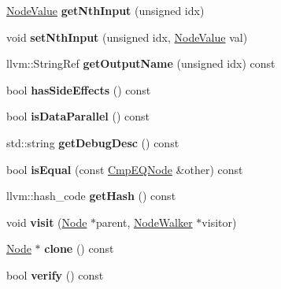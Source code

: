 \begin{DoxyCompactItemize}
\mbox{\label{classglow_1_1_cmp_e_q_node_acce58043f0d104161e728a8f650e8a51}} 
\hyperlink{structglow_1_1_node_value}{Node\+Value} {\bfseries get\+Nth\+Input} (unsigned idx)
\item 
\mbox{\label{classglow_1_1_cmp_e_q_node_a7d92ca06ce4b429dc00ee086a8bfa54b}} 
void {\bfseries set\+Nth\+Input} (unsigned idx, \hyperlink{structglow_1_1_node_value}{Node\+Value} val)
\item 
\mbox{\label{classglow_1_1_cmp_e_q_node_aba81b4f991f670f99168422720743284}} 
llvm\+::\+String\+Ref {\bfseries get\+Output\+Name} (unsigned idx) const
\item 
\mbox{\label{classglow_1_1_cmp_e_q_node_a1f5f8e69817a0eb9b35e6c460cb23ecc}} 
bool {\bfseries has\+Side\+Effects} () const
\item 
\mbox{\label{classglow_1_1_cmp_e_q_node_a530057c3737cf5bdf6a593dd7e80a352}} 
bool {\bfseries is\+Data\+Parallel} () const
\item 
\mbox{\label{classglow_1_1_cmp_e_q_node_a2541748fa47527b03bc21b7cc060431a}} 
std\+::string {\bfseries get\+Debug\+Desc} () const
\item 
\mbox{\label{classglow_1_1_cmp_e_q_node_ab3ba9251d0fcfb6ab3400fc9e9cee704}} 
bool {\bfseries is\+Equal} (const \hyperlink{classglow_1_1_cmp_e_q_node}{Cmp\+E\+Q\+Node} \&other) const
\item 
\mbox{\label{classglow_1_1_cmp_e_q_node_ac92576babe93889828299d0418ee2f74}} 
llvm\+::hash\+\_\+code {\bfseries get\+Hash} () const
\item 
\mbox{\label{classglow_1_1_cmp_e_q_node_a79eee2194bf38c525b1fc094de56ed11}} 
void {\bfseries visit} (\hyperlink{classglow_1_1_node}{Node} $\ast$parent, \hyperlink{classglow_1_1_node_walker}{Node\+Walker} $\ast$visitor)
\item 
\mbox{\label{classglow_1_1_cmp_e_q_node_af57a7fdae5080404b3368e40a4e7a8fc}} 
\hyperlink{classglow_1_1_node}{Node} $\ast$ {\bfseries clone} () const
\item 
\mbox{\label{classglow_1_1_cmp_e_q_node_a423d44bbb369d94f0161853e80bac134}} 
bool {\bfseries verify} () const
\end{DoxyCompactItemize}
